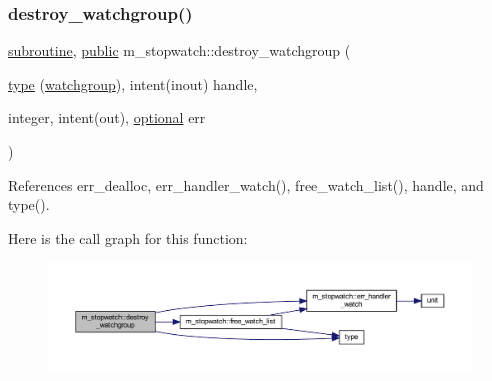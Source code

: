 \subsubsection{\texorpdfstring{destroy\+\_\+watchgroup()}{destroy\_watchgroup()}}
{\footnotesize\ttfamily \hyperlink{M__stopwatch_83_8txt_acfbcff50169d691ff02d4a123ed70482}{subroutine}, \hyperlink{M__stopwatch_83_8txt_a2f74811300c361e53b430611a7d1769f}{public} m\+\_\+stopwatch\+::destroy\+\_\+watchgroup (\begin{DoxyParamCaption}\item[{\hyperlink{stop__watch_83_8txt_a70f0ead91c32e25323c03265aa302c1c}{type} (\hyperlink{structm__stopwatch_1_1watchgroup}{watchgroup}), intent(inout)}]{handle,  }\item[{integer, intent(out), \hyperlink{option__stopwatch_83_8txt_aa4ece75e7acf58a4843f70fe18c3ade5}{optional}}]{err }\end{DoxyParamCaption})}



References err\+\_\+dealloc, err\+\_\+handler\+\_\+watch(), free\+\_\+watch\+\_\+list(), handle, and type().

Here is the call graph for this function\+:
\nopagebreak
\begin{figure}[H]
\begin{center}
\leavevmode
\includegraphics[width=350pt]{namespacem__stopwatch_a5441e214dd82a2356ed4f4fe892cbb51_cgraph}
\end{center}
\end{figure}
\mbox{\label{namespacem__stopwatch_a435c9495ff60ec1dc27d4b41f4030582}} 
